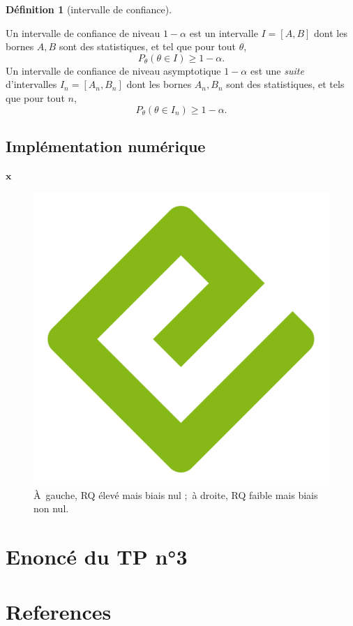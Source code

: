 \documentclass[
  10,
  letterpaper,
  DIV=11,
  numbers=noendperiod]{scrreport}
\newcommand{\bx}{\mathbf{x}}
\theoremstyle{definition}
\newtheorem{definition}{Définition}[chapter]
\theoremstyle{definition}
\theoremstyle{plain}
\theoremstyle{remark}
\begin{document}
\begin{definition}[intervalle de
confiance]\protect\hypertarget{def-ic}{}\label{def-ic}

Un intervalle de confiance de niveau \(1-\alpha\) est un intervalle
\(I = [A,B]\) dont les bornes \(A,B\) sont des statistiques, et tel que
pour tout \(\theta\), \[P_\theta(\theta \in I) \geqslant 1 - \alpha.\]
Un intervalle de confiance de niveau asymptotique \(1-\alpha\) est une
\emph{suite} d'intervalles \(I_n = [A_n,B_n]\) dont les bornes
\(A_n,B_n\) sont des statistiques, et tels que pour tout \(n\),
\[ P_\theta(\theta \in I_n) \geqslant 1 - \alpha.\]

\end{definition}

\section{Implémentation numérique}\label{impluxe9mentation-numuxe9rique}

\(\bx\)

\begin{figure}[H]

{\centering \includegraphics[width=0.5\linewidth,height=\textheight,keepaspectratio]{images/cover.png}

}

\caption{À~gauche, RQ élevé mais biais nul ;~à droite, RQ faible mais
biais non nul.}

\end{figure}%

\chapter{Enoncé du TP n°3}\label{enoncuxe9-du-tp-n3}


\chapter*{References}\label{references}
\end{document}
